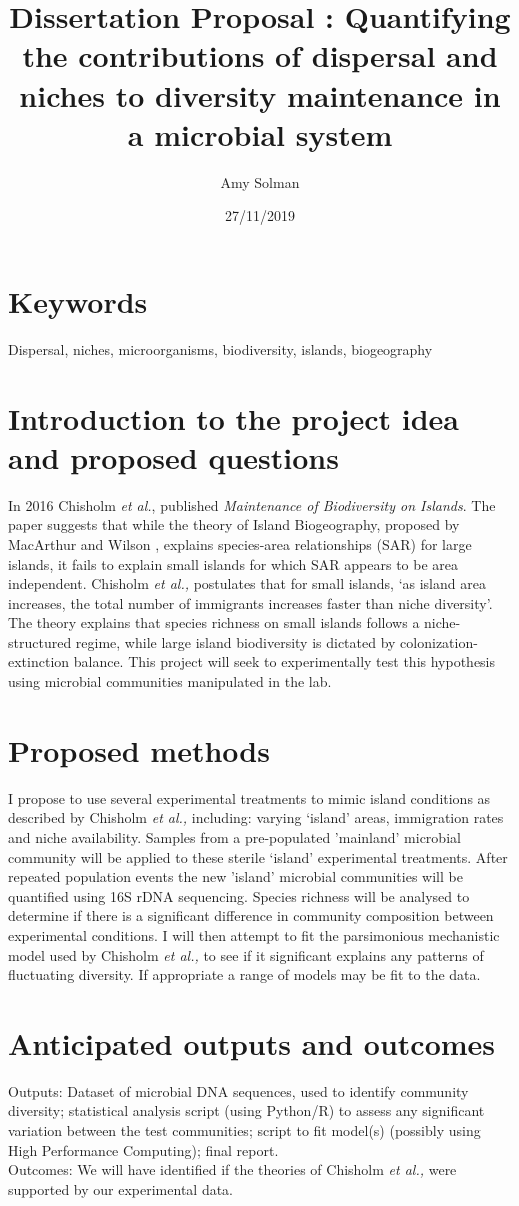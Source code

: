 \documentclass[11pt]{article}
\title{Dissertation Proposal : Quantifying the contributions of dispersal and niches to diversity maintenance in a microbial system}
\author{Amy Solman}
\date{27/11/2019}
\begin{document}
  
  
  \section{Keywords}
  Dispersal, niches, microorganisms, biodiversity, islands, biogeography

  \section{Introduction to the project idea and proposed questions}
  In 2016 Chisholm \textit{et al.}, published \textit{Maintenance of Biodiversity on Islands}\cite{chisholm2016maintenance}. The paper suggests that while the theory of Island Biogeography, proposed by MacArthur and Wilson \cite{wilson1967theory}, explains species-area relationships (SAR) for large islands, it fails to explain small islands for which SAR appears to be area independent. Chisholm \textit{et al.,} postulates that for small islands, ‘as island area increases, the total number of immigrants increases faster than niche diversity’. The theory explains that species richness on small islands follows a niche-structured regime, while large island biodiversity is dictated by colonization-extinction balance. This project will seek to experimentally test this hypothesis using microbial communities manipulated in the lab. 
  
  \section{Proposed methods}
  I propose to use several experimental treatments to mimic island conditions as described by Chisholm \textit{et al.,} including: varying ‘island’ areas, immigration rates and niche availability. Samples from a pre-populated 'mainland' microbial community will be applied to these sterile ‘island’ experimental treatments. After repeated population events the new 'island' microbial communities will be quantified using 16S rDNA sequencing. Species richness will be analysed to determine if there is a significant difference in community composition between experimental conditions. I will then attempt to fit the parsimonious mechanistic model used by Chisholm \textit{et al.,} to see if it significant explains any patterns of fluctuating diversity. If appropriate a range of models may be fit to the data.
  
  \section{Anticipated outputs and outcomes}
  Outputs: Dataset of microbial DNA sequences, used to identify community diversity; statistical analysis script (using Python/R) to assess any significant variation between the test communities; script to fit model(s) (possibly using High Performance Computing); final report. \\
Outcomes: We will have identified if the theories of Chisholm \textit{et al.,} were supported by our experimental data.
\end{document}
